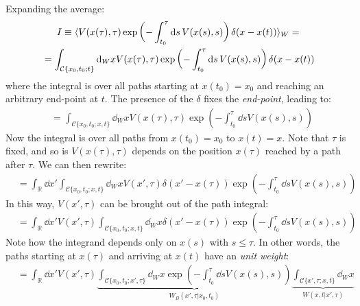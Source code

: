 \documentclass[../template.tex]{subfiles}
\begin{document}
\begin{exo}
    Expanding the average:
    \begin{align*}
        I\equiv \langle V(x(\tau), \tau) \exp\left(-\int_{t_0}^\tau \dd{s} V(x(s),s)\right) \delta(x-x(t))\rangle_W = \span\\
        &= \int_{\mathcal{C}\{x_0,t_0;t\}} \dd{_Wx V(x(\tau), \tau) \exp\left(-\int_{t_0}^\tau \dd{s} V(x(s),s)\right) \delta(x-x(t))}
    \end{align*}
    where the integral is over all paths starting at $x(t_0)=x_0$ and reaching an arbitrary end-point at $t$. The presence of the $\delta$ fixes the \textit{end-point}, leading to:
    \begin{align*}
        &=\int_{\mathcal{C}\{x_0,t_0;x,t\}} \dd{_Wx}  V(x(\tau), \tau) \exp\left(-\int_{t_0}^\tau \dd{s} V(x(s),s)\right) 
    \end{align*} 
    Now the integral is over all paths from $x(t_0) = x_0$ to $x(t) = x$. Note that $\tau$ is fixed, and so is $V(x(\tau), \tau)$ depends on the position $x(\tau)$ reached by a path after $\tau$. We can then rewrite:
    \begin{align*}
        &=\int_{\mathbb{R}} \dd{x'} \int_{\mathcal{C}\{x_0,t_0;x,t\}} \dd{_Wx} V(x',\tau) \delta(x'-x(\tau)) \exp\left(-\int_{t_0}^\tau \dd{s} V(x(s),s)\right)
    \end{align*}
    In this way, $V(x',\tau)$ can be brought out of the path integral:
    \begin{align*}
        &= \int_{\mathbb{R}}\dd{x'} V(x',\tau) \int_{\mathcal{C}\{x_0,t_0;x,t\}} \dd{_Wx}  \delta(x'-x(\tau)) \exp\left(-\int_{t_0}^\tau \dd{s} V(x(s),s)\right)
    \end{align*}
    Note how the integrand depends only on $x(s)$ with $s \leq \tau$. In other words, the paths starting at $x(\tau)$ and arriving at $x(t)$ have an \textit{unit weight}:
    \begin{align*}
        &= \int_{\mathbb{R}} \dd{x'} V(x',\tau)\underbrace{ \int_{\mathcal{C}\{x_0,t_0;x',\tau\}} \dd{_W x} \exp\left(-\int_{t_0}^\tau \dd{s} V(x(s),s)\right) }_{W_B(x',\tau|x_0,t_0)}\underbrace{\int_{\mathcal{C}\{x',\tau;x,t\}}\dd{_Wx}}_{W(x,t|x',\tau)}
    \end{align*}
    
\end{exo}
\end{document}

